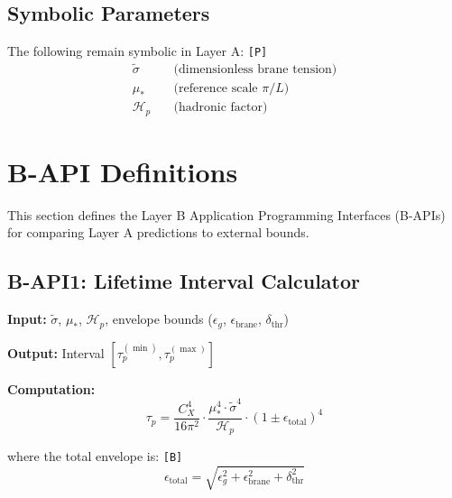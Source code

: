 \documentclass[11pt,a4paper]{article}
\newcommand{\tagP}{\textcolor{orange!80!black}{\texttt{[P]}}}
\newcommand{\tagB}{\textcolor{purple!70!black}{\texttt{[B]}}}
\theoremstyle{definition}
\begin{document}
\subsection{Symbolic Parameters}
\label{subsec:symbolic-params}

The following remain symbolic in Layer A: \tagP{}
\begin{align}
\label{eq:symbolic-sigma}
\tilde{\sigma} &\quad \text{(dimensionless brane tension)} \\
\label{eq:symbolic-mu}
\mu_* &\quad \text{(reference scale } \pi/L\text{)} \\
\label{eq:symbolic-hp}
\mathcal{H}_p &\quad \text{(hadronic factor)}
\end{align}


\section{B-API Definitions}
\label{sec:b-api}

This section defines the Layer B Application Programming Interfaces (B-APIs)
for comparing Layer A predictions to external bounds.

\subsection{B-API1: Lifetime Interval Calculator}
\label{subsec:b-api1}

\begin{apibox}
\textbf{Input:} $\tilde{\sigma}$, $\mu_*$, $\mathcal{H}_p$, envelope bounds ($\epsilon_g$, $\epsilon_{\text{brane}}$, $\delta_{\text{thr}}$)

\textbf{Output:} Interval $[\tau_p^{(\min)}, \tau_p^{(\max)}]$

\textbf{Computation:}
\begin{equation}
\label{eq:b-api1-formula}
\tau_p = \frac{C_X^4}{16\pi^2} \cdot \frac{\mu_*^4 \cdot \tilde{\sigma}^4}{\mathcal{H}_p} \cdot (1 \pm \epsilon_{\text{total}})^4
\end{equation}

where the total envelope is: \tagB{}
\begin{equation}
\label{eq:total-envelope}
\epsilon_{\text{total}} = \sqrt{\epsilon_g^2 + \epsilon_{\text{brane}}^2 + \delta_{\text{thr}}^2}
\end{equation}
\end{apibox}
\end{document}
